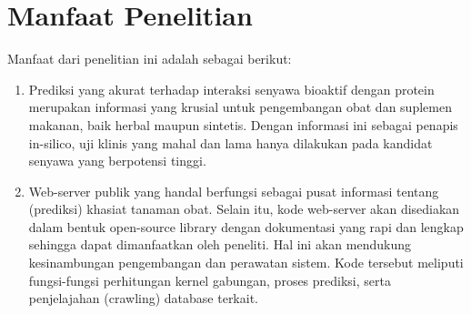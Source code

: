 \section{Manfaat Penelitian}
Manfaat dari penelitian ini adalah sebagai berikut:

\begin{enumerate} [topsep=0mm]
\itemsep0mm
\item
Prediksi yang akurat terhadap interaksi senyawa bioaktif dengan protein merupakan informasi yang krusial untuk pengembangan obat dan suplemen makanan, baik herbal maupun sintetis.
Dengan informasi ini sebagai penapis in-silico, uji klinis yang mahal dan lama hanya dilakukan pada kandidat senyawa yang berpotensi tinggi.

\item
Web-server publik yang handal berfungsi sebagai pusat informasi tentang (prediksi) khasiat tanaman obat.
Selain itu, kode web-server akan disediakan dalam bentuk open-source library dengan dokumentasi yang rapi dan lengkap sehingga dapat dimanfaatkan oleh peneliti.
Hal ini akan mendukung kesinambungan pengembangan dan perawatan sistem.
Kode tersebut meliputi fungsi-fungsi perhitungan kernel gabungan, proses prediksi, serta penjelajahan (crawling) database terkait.
\end{enumerate}
